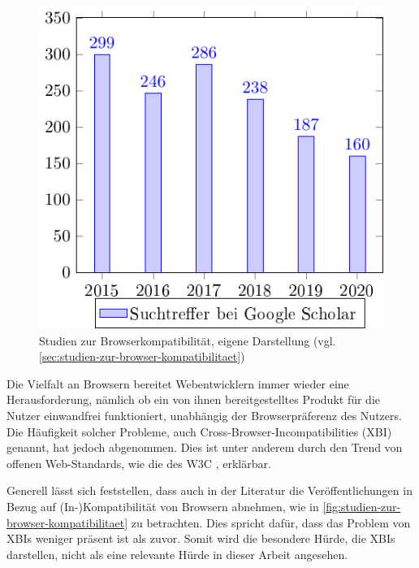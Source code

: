 \begin{figure}
\centering
\includegraphics[width=\linewidth]{img/02_theorie/cross-browser_metastudie.png.pdf}
\caption{Studien zur Browserkompatibilität, eigene Darstellung (vgl. \ref{sec:studien-zur-browser-kompatibilitaet})}
\label{fig:studien-zur-browser-kompatibilitaet}
\end{figure}

Die Vielfalt an Browsern bereitet Webentwicklern immer wieder eine Herausforderung, nämlich ob ein von ihnen bereitgestelltes Produkt für die Nutzer einwandfrei funktioniert, unabhängig der Browserpräferenz des Nutzers. Die Häufigkeit solcher Probleme, auch Cross-Browser-Incompatibilities (XBI) \cite{XBIs} genannt, hat jedoch abgenommen. Dies ist unter anderem durch den Trend von offenen Web-Standards, wie die des W3C \cite{W3CStandards}, erklärbar.


Generell lässt sich feststellen, dass auch in der Literatur die Veröffentlichungen in Bezug auf (In-)Kompatibilität von Browsern abnehmen, wie in \autoref{fig:studien-zur-browser-kompatibilitaet} zu betrachten. Dies spricht dafür, dass das Problem von XBIs weniger präsent ist als zuvor. Somit wird die besondere Hürde, die XBIs darstellen, nicht als eine relevante Hürde in dieser Arbeit angesehen.

